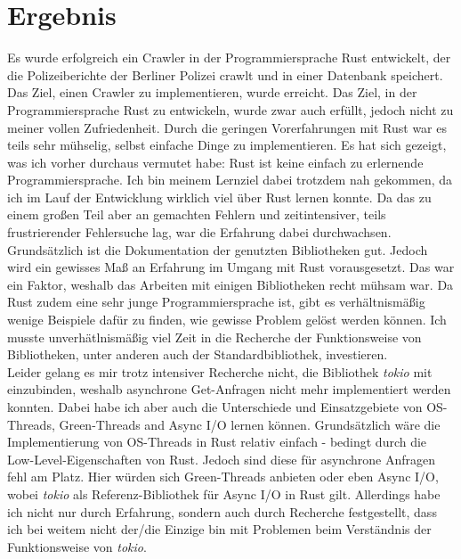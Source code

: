 \section{Ergebnis}
\label{sec:rust_ergebnis}
Es wurde erfolgreich ein Crawler in der Programmiersprache Rust entwickelt,
der die Polizeiberichte der Berliner Polizei crawlt und in einer Datenbank
speichert. Das Ziel, einen Crawler zu implementieren, wurde erreicht. Das
Ziel, in der Programmiersprache Rust zu entwickeln, wurde zwar auch erfüllt,
jedoch nicht zu meiner vollen Zufriedenheit. Durch die geringen
Vorerfahrungen mit Rust war es teils sehr mühselig, selbst einfache Dinge zu
implementieren. Es hat sich gezeigt, was ich vorher durchaus vermutet habe: Rust
ist keine einfach zu erlernende Programmiersprache. Ich bin meinem Lernziel
dabei trotzdem nah gekommen, da ich im Lauf der Entwicklung wirklich viel
über Rust lernen konnte. Da das zu einem großen Teil aber an gemachten
Fehlern und zeitintensiver, teils frustrierender Fehlersuche lag, war die
Erfahrung dabei durchwachsen.\\
Grundsätzlich ist die Dokumentation der genutzten Bibliotheken gut. Jedoch
wird ein gewisses Maß an Erfahrung im Umgang mit Rust
vorausgesetzt. Das war ein Faktor, weshalb das Arbeiten mit einigen
Bibliotheken recht mühsam war. Da Rust zudem eine sehr junge
Programmiersprache ist, gibt es verhältnismäßig wenige Beispiele dafür zu
finden, wie gewisse Problem gelöst werden können. Ich musste
unverhätlnismäßig viel Zeit in die Recherche der Funktionsweise von
Bibliotheken, unter anderen auch der Standardbibliothek, investieren.\\
Leider gelang es mir trotz intensiver Recherche nicht, die Bibliothek
\emph{tokio} mit einzubinden, weshalb asynchrone Get-Anfragen nicht mehr
implementiert werden konnten. Dabei habe ich aber auch die Unterschiede und
Einsatzgebiete von OS-Threads, Green-Threads and Async I/O lernen können.
Grundsätzlich wäre die Implementierung von OS-Threads in Rust relativ einfach
- bedingt durch die Low-Level-Eigenschaften von Rust. Jedoch sind diese für
asynchrone Anfragen fehl am Platz. Hier würden sich Green-Threads anbieten
oder eben Async I/O, wobei \emph{tokio} als Referenz-Bibliothek für Async I/O
in Rust gilt. Allerdings habe ich nicht nur durch Erfahrung, sondern auch
durch Recherche festgestellt, dass ich bei weitem nicht der/die Einzige bin
mit Problemen beim Verständnis der Funktionsweise von \emph{tokio}.

